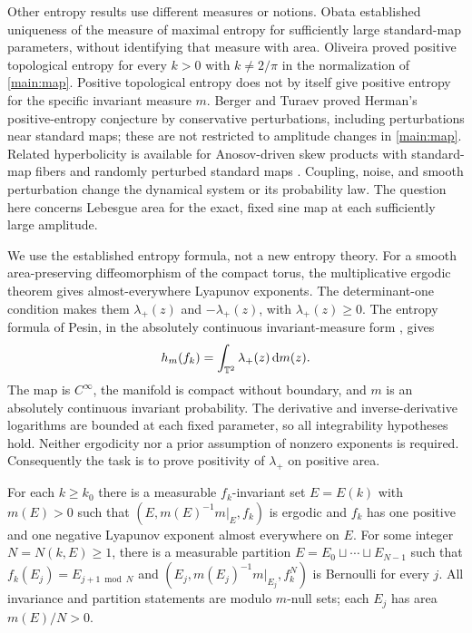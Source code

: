 Other entropy results use different measures or notions. Obata
\cite{Obata2021} established uniqueness of the measure of maximal
entropy for sufficiently large standard-map parameters, without
identifying that measure with area. Oliveira
\cite[Theorem~5.1]{Oliveira2024} proved positive topological entropy
for every $k>0$ with $k\ne2/\pi$ in the normalization of
\cref{main:map}. Positive topological entropy does not by itself give positive
entropy for the specific invariant measure $m$. Berger and Turaev
\cite{BergerTuraev2019} proved Herman's positive-entropy conjecture by
conservative perturbations, including perturbations near standard
maps; these are not restricted to amplitude changes in \cref{main:map}.
Related hyperbolicity is available for Anosov-driven skew products
with standard-map fibers
\cite{BergerCarrasco2014} and randomly perturbed standard maps
\cite{BlumenthalXueYoung2017}. Coupling, noise, and smooth
perturbation change the dynamical system or its probability law. The
question here concerns Lebesgue area for the exact, fixed sine map at
each sufficiently large amplitude.

We use the established entropy formula, not a new entropy theory.
For a smooth area-preserving diffeomorphism of the compact torus,
the multiplicative ergodic theorem \cite{Oseledets1968} gives
almost-everywhere Lyapunov exponents. The determinant-one condition
makes them $\lambda_+(z)$ and $-\lambda_+(z)$, with
$\lambda_+(z)\ge0$. The entropy formula of Pesin, in the absolutely
continuous invariant-measure form
\cite{Pesin1977,Mane1981,Mane1983Errata}, gives
\begin{equation}\label{main:pesin}
 h_m(f_k)=\int_{\mathbb{T}^2}\lambda_+(z)\,\mathrm{d} m(z).
\end{equation}
The map is $C^\infty$, the manifold is compact without boundary,
and $m$ is an absolutely continuous invariant probability. The
derivative and inverse-derivative logarithms are bounded at each fixed
parameter, so all integrability hypotheses hold. Neither ergodicity
nor a prior assumption of nonzero exponents is required. Consequently
the task is to prove positivity of $\lambda_+$ on positive area.

\begin{corollary}
\label{main:components}
For each $k\ge k_0$ there is a measurable $f_k$-invariant set $E=E(k)$
with $m(E)>0$ such that $(E,m(E)^{-1}m|_E,f_k)$ is ergodic and $f_k$ has
one positive and one negative Lyapunov exponent almost everywhere on $E$.
For some integer $N=N(k,E)\ge1$, there is a measurable partition
$E=E_0\sqcup\cdots\sqcup E_{N-1}$ such that
$f_k(E_j)=E_{j+1\bmod N}$ and
$(E_j,m(E_j)^{-1}m|_{E_j},f_k^N)$ is Bernoulli for every $j$.
All invariance and partition statements are modulo $m$-null sets;
each $E_j$ has area $m(E)/N>0$.
\end{corollary}

